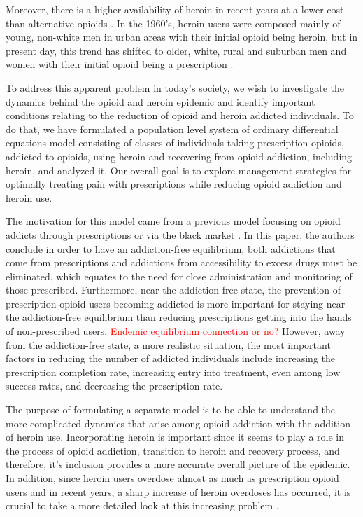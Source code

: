 \documentclass[12pt]{article}
\begin{document}
Moreover, there is a higher availability of heroin in recent years at a lower cost than alternative opioids \cite{NIDA1}. In the 1960's, heroin users were composed mainly of young, non-white men in urban areas with their initial opioid being heroin, but in present day, this trend has shifted to older, white, rural and suburban men and women with their initial opioid being a prescription \cite{NIDA1}. 

To address this apparent problem in today's society, we wish to investigate the dynamics behind the opioid and heroin epidemic and identify important conditions relating to the reduction of opioid and heroin addicted individuals. To do that, we have formulated a population level system of ordinary differential equations model consisting of classes of individuals taking prescription opioids, addicted to opioids, using heroin and recovering from opioid addiction, including heroin, and analyzed it. Our overall goal is to explore management strategies for optimally treating pain with prescriptions while reducing opioid addiction and heroin use. 

The motivation for this model came from a previous model focusing on opioid addicts through prescriptions or via the black market \cite{Strickland}. In this paper, the authors conclude in order to have an addiction-free equilibrium, both addictions that come from prescriptions and addictions from accessibility to excess drugs must be eliminated, which equates to the need for close administration and monitoring of those prescribed. Furthermore, near the addiction-free state, the prevention of prescription opioid users becoming addicted is more important for staying near the addiction-free equilibrium than reducing prescriptions getting into the hands of non-prescribed users. \textcolor{red}{Endemic equilibrium connection or no?} However, away from the addiction-free state, a more realistic situation, the most important factors in reducing the number of addicted individuals include increasing the prescription completion rate, increasing entry into treatment, even among low success rates, and decreasing the prescription rate. 

The purpose of formulating a separate model is to be able to understand the more complicated dynamics that arise among opioid addiction with the addition of heroin use. Incorporating heroin is important since it seems to play a role in the process of opioid  addiction, transition to heroin and recovery process, and therefore, it's inclusion provides a more accurate overall picture of the epidemic. In addition, since heroin users overdose almost as much as prescription opioid users and in recent years, a sharp increase of heroin overdoses has occurred, it is crucial to take a more detailed look at this increasing problem \cite{CDC4}. 
\end{document}
